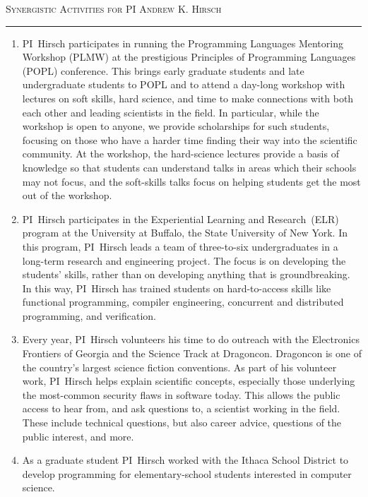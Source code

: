 



\begin{center}
{\LARGE
\textsc{Synergistic Activities for PI Andrew K. Hirsch}
}
\end{center}
\hrule
\vspace{3mm}

\begin{enumerate}
\item PI~Hirsch participates in running the Programming Languages Mentoring Workshop (PLMW) at the prestigious Principles of Programming  Languages (POPL) conference.
  This brings early graduate students and late undergraduate students to POPL and to attend a day-long workshop with lectures on soft skills, hard science, and time to make connections with both each other and leading scientists in the field.
  In particular, while the workshop is open to anyone, we provide scholarships for such students, focusing on those who have a harder time finding their way into the scientific community.
  At the workshop, the hard-science lectures provide a basis of knowledge so that students can understand talks in areas which their schools may not focus, and the soft-skills talks focus on helping students get the most out of the workshop.
\item PI~Hirsch participates in the Experiential Learning and Research~(ELR) program at the University at Buffalo, the State University of New York.
  In this program, PI~Hirsch leads a team of three-to-six undergraduates in a long-term research and engineering project.
  The focus is on developing the students' skills, rather than on developing anything that is groundbreaking.
  In this way, PI~Hirsch has trained students on hard-to-access skills like functional programming, compiler engineering, concurrent and distributed programming, and verification.
\item Every year, PI~Hirsch volunteers his time to do outreach with the Electronics Frontiers of Georgia and the Science Track at Dragoncon.
  Dragoncon is one of the country's largest science fiction conventions.
  As part of his volunteer work, PI~Hirsch helps explain scientific concepts, especially those underlying the most-common security flaws in software today.
  This allows the public access to hear from, and ask questions to, a scientist working in the field.
  These include technical questions, but also career advice, questions of the public interest, and more.
\item As a graduate student PI~Hirsch worked with the Ithaca School District to develop programming for elementary-school students interested in computer science.

\end{enumerate}
